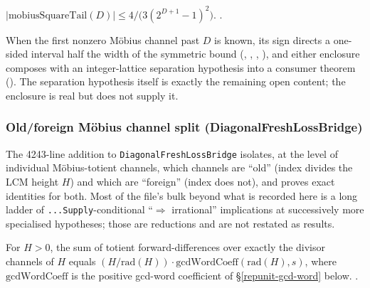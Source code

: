 \begin{prop}
$|\mathrm{mobiusSquareTail}(D)| \le 4/\bigl(3(2^{D+1}-1)^2\bigr)$.
\quad {} \quad {} \quad {}.
\end{prop}

\begin{obs}
When the first nonzero Möbius channel past $D$ is known, its sign directs a
one-sided interval half the width of the symmetric bound
(,
, , ), and either
enclosure composes with an integer-lattice separation hypothesis into a
consumer theorem
().
The separation hypothesis itself is exactly the remaining open content; the
enclosure is real but does not supply it.
\end{obs}

\subsubsection{Old/foreign Möbius channel split (DiagonalFreshLossBridge)}

The 4243-line addition to \texttt{DiagonalFreshLossBridge} isolates, at the
level of individual Möbius-totient channels, which channels are ``old''
(index divides the LCM height $H$) and which are ``foreign'' (index does
not), and proves exact identities for both. Most of the file's bulk beyond
what is recorded here is a long ladder of \texttt{...Supply}-conditional
``$\Rightarrow$ irrational'' implications at successively more specialised
hypotheses; those are reductions and are not restated as results.

\begin{prop}
For $H>0$, the sum of totient forward-differences over exactly the divisor
channels of $H$ equals
$(H/\mathrm{rad}(H))\cdot\mathrm{gcdWordCoeff}(\mathrm{rad}(H),s)$, where
$\mathrm{gcdWordCoeff}$ is the positive gcd-word coefficient of
\S\ref{repunit-gcd-word} below.
\quad {} \quad {} \quad {}.
\end{prop}

